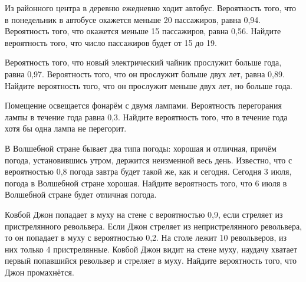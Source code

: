 \begin{listofex}
	\item Из районного центра в деревню ежедневно ходит автобус. Вероятность того, что в понедельник в автобусе окажется меньше 20 пассажиров, равна 0,94. Вероятность того, что окажется меньше 15 пассажиров, равна 0,56. Найдите вероятность того, что число пассажиров будет от 15 до 19.
	\item Вероятность того, что новый электрический чайник прослужит больше года, равна 0,97. Вероятность того, что он прослужит больше двух лет, равна 0,89. Найдите вероятность того, что он прослужит меньше двух лет, но больше года.
	\item Помещение освещается фонарём с двумя лампами. Вероятность перегорания лампы в течение года равна 0,3. Найдите вероятность того, что в течение года хотя бы одна лампа не перегорит.
	\item В Волшебной стране бывает два типа погоды: хорошая и отличная, причём погода, установившись утром, держится неизменной весь день. Известно, что с вероятностью 0,8 погода завтра будет такой же, как и сегодня. Сегодня 3 июля, погода в Волшебной стране хорошая. Найдите вероятность того, что 6 июля в Волшебной стране будет отличная погода.
	\item Ковбой Джон попадает в муху на стене с вероятностью 0,9, если стреляет из пристрелянного револьвера. Если Джон стреляет из непристрелянного револьвера, то он попадает в муху с вероятностью 0,2. На столе лежит 10 револьверов, из них только 4 пристрелянные. Ковбой Джон видит на стене муху, наудачу хватает первый попавшийся револьвер и стреляет в муху. Найдите вероятность того, что Джон промахнётся.
\end{listofex}
%
%
%
%
%
%
